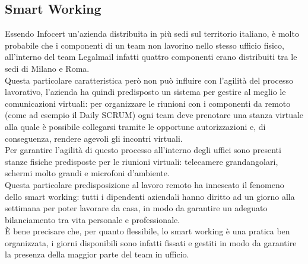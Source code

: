 \subsection{Smart Working}
Essendo Infocert un'azienda distribuita in più sedi sul territorio italiano, è molto probabile che i componenti di un team non lavorino nello stesso ufficio fisico, all'interno del team Legalmail infatti quattro componenti erano distribuiti tra le sedi di Milano e Roma. \\
Questa particolare caratteristica però non può influire con l'agilità del processo lavorativo, l'azienda ha quindi predisposto un sistema per gestire al meglio le comunicazioni virtuali: per organizzare le riunioni con i componenti da remoto (come ad esempio il Daily SCRUM) ogni team deve prenotare una stanza virtuale alla quale è possibile collegarsi tramite le opportune autorizzazioni e, di conseguenza, rendere agevoli gli incontri virtuali.\\
Per garantire l'agilità di questo processo all'interno degli uffici sono presenti stanze fisiche predisposte per le riunioni virtuali: telecamere grandangolari, schermi molto grandi e microfoni d'ambiente. \\
Questa particolare predisposizione al lavoro remoto ha innescato il fenomeno dello smart working: tutti i dipendenti aziendali hanno diritto ad un giorno alla settimana per poter lavorare da casa, in modo da garantire un adeguato bilanciamento tra vita personale e professionale. \\
È bene precisare che, per quanto flessibile, lo smart working è una pratica ben organizzata, i giorni disponibili sono infatti fissati e gestiti in modo da garantire la presenza della maggior parte del team in ufficio. 
